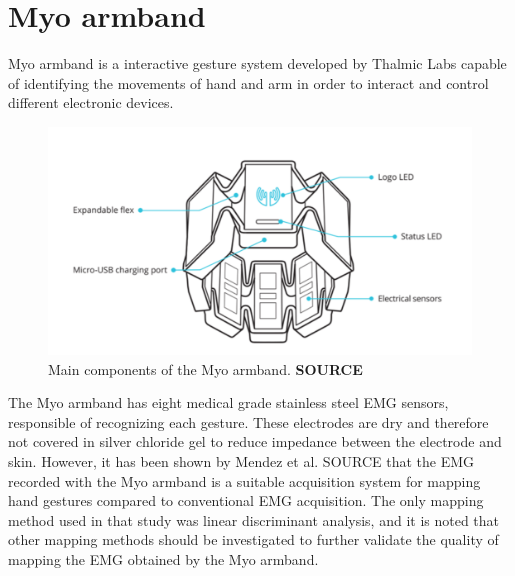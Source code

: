 \section{Myo armband}

Myo armband is a interactive gesture system developed by Thalmic Labs capable of identifying the movements of hand and arm in order to interact and control different electronic devices.

\begin{figure}[H]                    
	\includegraphics[width=.5\textwidth]{figures/myob/armband}  %
	\caption{Main components of the Myo armband. \textbf{SOURCE}}
	\label{fig:armband}  %
\end{figure}



The Myo armband has eight medical grade stainless steel EMG sensors, responsible of recognizing each gesture. These electrodes are dry and therefore not covered in silver chloride gel to reduce impedance between the electrode and skin. However, it has been shown by Mendez et al. SOURCE that the EMG recorded with the Myo armband is a suitable acquisition system for mapping hand gestures compared to conventional EMG acquisition. The only mapping method used in that study was linear discriminant analysis, and it is noted that other mapping methods should be investigated to further validate the quality of mapping the EMG obtained by the Myo armband. 

